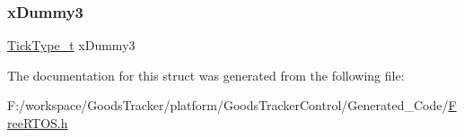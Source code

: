 \subsubsection{\texorpdfstring{x\+Dummy3}{xDummy3}}
{\footnotesize\ttfamily \hyperlink{portmacro_8h_aa69c48c6e902ce54f70886e6573c92a9}{Tick\+Type\+\_\+t} x\+Dummy3}



The documentation for this struct was generated from the following file\+:\begin{DoxyCompactItemize}
\item 
F\+:/workspace/\+Goods\+Tracker/platform/\+Goods\+Tracker\+Control/\+Generated\+\_\+\+Code/\hyperlink{_free_r_t_o_s_8h}{Free\+R\+T\+O\+S.\+h}\end{DoxyCompactItemize}
